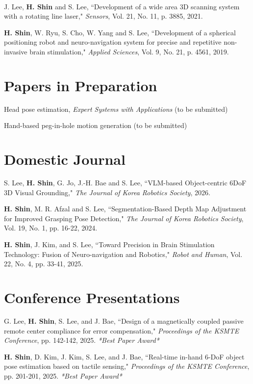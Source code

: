 \documentclass[margin,line]{res}
\begin{document}
\begin{resume}
J. Lee\textsuperscript{\textdagger}, \textbf{H. Shin}\textsuperscript{\textdagger} and S. Lee, ``Development of a wide area 3D scanning system with a rotating line laser," \textit{Sensors}, Vol. 21, No. 11, p. 3885, 2021.

\textbf{H. Shin}, W. Ryu, S. Cho, W. Yang and S. Lee, ``Development of a spherical positioning robot and neuro-navigation system for precise and repetitive non-invasive brain stimulation," \textit{Applied Sciences}, Vol. 9, No. 21, p. 4561, 2019.


\section{\sc Papers in Preparation}

Head pose estimation, \textit{Expert Systems with Applications} (to be submitted)

Hand-based peg-in-hole motion generation (to be submitted)


\section{\sc Domestic Journal}

S. Lee, \textbf{H. Shin}, G. Jo, J.-H. Bae and S. Lee, ``VLM-based Object-centric 6DoF 3D Visual Grounding," \textit{The Journal of Korea Robotics Society}, 2026.

\textbf{H. Shin}, M. R. Afzal and S. Lee, ``Segmentation-Based Depth Map Adjustment for Improved Grasping Pose Detection," \textit{The Journal of Korea Robotics Society}, Vol. 19, No. 1, pp. 16-22, 2024.

\textbf{H. Shin}, J. Kim, and S. Lee, ``Toward Precision in Brain Stimulation Technology: Fusion of Neuro-navigation and Robotics," \textit{Robot and Human}, Vol. 22, No. 4, pp. 33-41, 2025.


\section{\sc Conference Presentations}

G. Lee, \textbf{H. Shin}, S. Lee, and J. Bae, ``Design of a magnetically coupled passive remote center compliance for error compensation," \textit{Proceedings of the KSMTE Conference}, pp. 142-142, 2025. \textit{*Best Paper Award*}

\textbf{H. Shin}, D. Kim, J. Kim, S. Lee, and J. Bae, ``Real-time in-hand 6-DoF object pose estimation based on tactile sensing," \textit{Proceedings of the KSMTE Conference}, pp. 201-201, 2025. \textit{*Best Paper Award*}


\end{resume}
\end{document}
